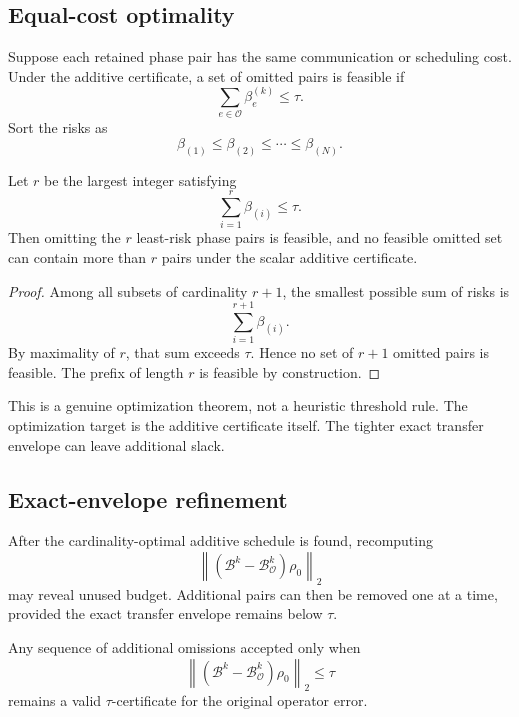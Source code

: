 \subsection{Equal-cost optimality}

Suppose each retained phase pair has the same communication or scheduling
cost.  Under the additive certificate, a set of omitted pairs is feasible if
\[
\sum_{e\in\mathcal O}\beta_e^{(k)}\le\tau.
\]
Sort the risks as
\[
\beta_{(1)}\le\beta_{(2)}\le\cdots\le\beta_{(N)}.
\]

\begin{theorem}
\label{thm:unit-cost-optimal}
Let $r$ be the largest integer satisfying
\[
\sum_{i=1}^{r}\beta_{(i)}\le\tau.
\]
Then omitting the $r$ least-risk phase pairs is feasible, and no feasible
omitted set can contain more than $r$ pairs under the scalar additive
certificate.
\end{theorem}

\begin{proof}
Among all subsets of cardinality $r+1$, the smallest possible sum of risks is
\[
\sum_{i=1}^{r+1}\beta_{(i)}.
\]
By maximality of $r$, that sum exceeds $\tau$.  Hence no set of $r+1$ omitted
pairs is feasible.  The prefix of length $r$ is feasible by construction.
\end{proof}

This is a genuine optimization theorem, not a heuristic threshold rule.  The
optimization target is the additive certificate itself. The tighter exact
transfer envelope can leave additional slack.

\subsection{Exact-envelope refinement}

After the cardinality-optimal additive schedule is found, recomputing
\[
\left\lVert
(\mathcal B^k-\mathcal B_{\mathcal O}^k)\rho_0
\right\rVert_2
\]
may reveal unused budget.  Additional pairs can then be removed one at a time,
provided the exact transfer envelope remains below $\tau$.

\begin{proposition}\label{claim:final-16-5}
Any sequence of additional omissions accepted only when
\[
\left\lVert
(\mathcal B^k-\mathcal B_{\mathcal O}^k)\rho_0
\right\rVert_2\le\tau
\]
remains a valid $\tau$-certificate for the original operator error.
\end{proposition}

